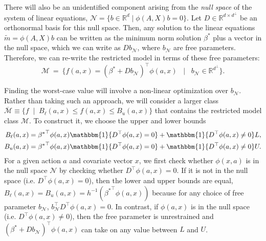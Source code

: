 \documentclass[12pt]{article}
\theoremstyle{definition}
\newcommand{\R}{\ensuremath{\mathbb{R}}}
\newcommand{\bbone}{\ensuremath{\mathbbm{1}}}
\newcommand{\<}{\langle}
\renewcommand{\>}{\rangle}
\newcommand\mcal[1]{\ensuremath{\mathcal{#1}}}
\begin{document}
There will also be an unidentified component arising from the
\emph{null space} of the system of linear equations,
$\mcal{N} = \{b \in \R^d \mid \phi(A, X) b = 0\}$.  Let
$D \in \R^{d \times d^\perp}$ be an orthonormal basis for this null
space.  Then, any solution to the linear equations
$\tilde{m} = \phi(A, X) b$ can be written as the minimum norm solution
$\beta^\ast$ plus a vector in the null space, which we can write as
$D b_\mathcal{N}$, where $b_\mathcal{N}$ are free parameters.
Therefore, we can re-write the restricted model in terms of these free
parameters:
\begin{equation*}
  \mcal{M} \ = \ \{f(a, x) = (\beta^\ast + D
  b_{\mcal{N}})^\top \phi(a, x) \;\; \mid \;\; b_{\mcal{N}} \in \R^{d^\perp}\}.
\end{equation*}

Finding the worst-case value will
involve a non-linear optimization over $b_\mcal{N}$.
Rather than taking such an approach, we will
consider a larger class
$\overline{\mcal{M}} \equiv \{f \; \mid \; B_\ell(a, x) \leq f(a, x)
\leq B_u(a,x)\}$ that contains the restricted model class
$\mcal{M}$.
To construct it, we choose the upper and lower bounds
\begin{align*}
  B_\ell(a,x) & = {\beta^\ast}^\top \phi(a,x) \bbone\{D^\top\phi(a,x) = 0\} + \bbone\{D^\top\phi(a,x) \neq 0\} L,\\
  B_u(a,x) & = {\beta^\ast}^\top \phi(a,x) \bbone\{D^\top\phi(a,x) = 0\} + \bbone\{D^\top\phi(a,x) \neq 0\} U.
\end{align*}
For a given action $a$ and covariate vector $x$, we first check whether
$\phi(x,a)$ is in the null space $\mathcal{N}$ by checking whether $D^\top \phi(a, x) = 0$. If it is not in the null space (i.e. $D^\top \phi(a, x) = 0$),
then the lower and upper bounds are equal, $B_\ell(a,x) = B_u(a,x) = h^{-1}({\beta^\ast}^\top \phi(a,x))$ because for any choice of free parameter $b_\mathcal{N}$,
$b_\mathcal{N}^\top D^\top \phi(a,x) = 0$.
In contrast, if $\phi(a,x)$ is in the null space (i.e. $D^\top \phi(a, x) \neq 0$), then the free parameter is unrestrained and $(\beta^\ast + D
b_{\mcal{N}})^\top \phi(a, x)$ can take on any value between $L$ and $U$.
\end{document}
